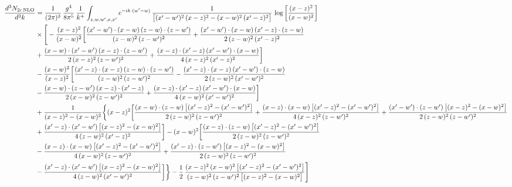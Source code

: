 \documentclass[9pt]{article}
\numberwithin{equation}{section}
\begin{document}
\begin{align}
\frac{d^{3}N_{2c\,\rm NLO}}{d^{3}k} &= \frac{1}{(2\pi)^{3}}\,\frac{g^{4}}{8\pi^{5}}\,\frac{1}{k^{+}}\int_{z,w,w^{\prime},x,x^{\prime}}e^{-ik\cdot(w^{\prime}-w)}\,\frac{1}{\big[(x^{\prime}-w^{\prime})^{2}\,(x-z)^{2}-(x-w)^{2}\,(x^{\prime}-z)^{2}\big]}\,\log\left[\frac{(x-z)^{2}}{(x-w)^{2}}\right]\notag\\
&\times\Bigg[-\frac{(x-z)^{2}}{(x-w)^{2}}\bigg[\frac{(x^{\prime}-w^{\prime})\cdot(x-w)\,(z-w)\cdot(z-w^{\prime})}{(z-w)^{2}\,(z-w^{\prime})^{2}}+\frac{(x^{\prime}-w^{\prime})\cdot(x-w)\,(x^{\prime}-z)\cdot(z-w)}{2\,(z-w)^{2}\,(x^{\prime}-z)^{2}}\notag \\ & +\frac{(x-w)\cdot(x^{\prime}-w^{\prime})\,(x-z)\cdot(z-w^{\prime})}{2\,(x-z)^{2}\,(z-w^{\prime})^{2}}+\frac{(x-z)\cdot(x^{\prime}-z)\,(x^{\prime}-w^{\prime})\cdot(x-w)}{4\,(x-z)^{2}\,(x^{\prime}-z)^{2}}\bigg]\notag\\
&-\frac{(x-w)^{2}}{(x-z)^{2}}\bigg[\frac{(x^{\prime}-z)\cdot(x-z)\,(z-w)\cdot(z-w^{\prime})}{(z-w)^{2}\,(z-w^{\prime})^{2}}-\frac{(x^{\prime}-z)\cdot(x-z)\,(x^{\prime}-w^{\prime})\cdot(z-w)}{2\,(z-w)^{2}\,(x^{\prime}-w^{\prime})^{2}}\notag \\ & -\frac{(x-w)\cdot(z-w^{\prime})\,(x-z)\cdot(x^{\prime}-z)}{2\,(x-w)^{2}\,(z-w^{\prime})^{2}}+\frac{(x-z)\cdot(x^{\prime}-z)\,(x^{\prime}-w^{\prime})\cdot(x-w)}{4\,(x-w)^{2}\,(x^{\prime}-w^{\prime})^{2}}\bigg]\notag\\
&+\frac{1}{(x-z)^{2}-(x-w)^{2}}\bigg\{(x-z)^{2}\bigg[\frac{(x-w)\cdot(z-w)\,\big[(x^{\prime}-z)^{2}-(x^{\prime}-w^{\prime})^{2}\big]}{2\,(z-w)^{2}\,(z-w^{\prime})^{2}}+\frac{(x-z)\cdot(x-w)\,\big[(x^{\prime}-z)^{2}-(x^{\prime}-w^{\prime})^{2}\big]}{4\,(x-z)^{2}\,(z-w^{\prime})^{2}}+\frac{(x^{\prime}-w^{\prime})\cdot(z-w^{\prime})\,\big[(x-z)^{2}-(x-w)^{2}\big]}{2\,(z-w)^{2}\,(z-w^{\prime})^{2}}\notag \\ & +\frac{(x^{\prime}-z)\cdot(x^{\prime}-w^{\prime})\,\big[(x-z)^{2}-(x-w)^{2}\big]}{4\,(z-w)^{2}\,(x^{\prime}-z)^{2}}\bigg]-(x-w)^{2}\bigg[\frac{(x-z)\cdot(z-w)\,\big[(x^{\prime}-z)^{2}-(x^{\prime}-w^{\prime})^{2}\big]}{2\,(z-w)^{2}\,(z-w^{\prime})^{2}}\notag \\ & -\frac{(x-z)\cdot(x-w)\,\big[(x^{\prime}-z)^{2}-(x^{\prime}-w^{\prime})^{2}\big]}{4\,(x-w)^{2}\,(z-w^{\prime})^{2}}+\frac{(x^{\prime}-z)\cdot(z-w^{\prime})\,\big[(x-z)^{2}-(x-w)^{2}\big]}{2\,(z-w)^{2}\,(z-w^{\prime})^{2}}\notag \\ & -\frac{(x^{\prime}-z)\cdot(x^{\prime}-w^{\prime})\,\big[(x-z)^{2}-(x-w)^{2}\big]}{4\,(z-w)^{2}\,(x^{\prime}-w^{\prime})^{2}}\bigg]\bigg\}-\frac{1}{2}\,\frac{(x-z)^{2}\,(x-w)^{2}\,\big[(x^{\prime}-z)^{2}-(x^{\prime}-w^{\prime})^{2}\big]}{(z-w)^{2}\,(z-w^{\prime})^{2}\,\big[(x-z)^{2}-(x-w)^{2}\big]}\Bigg]\notag\\

\end{align}
\end{document}
